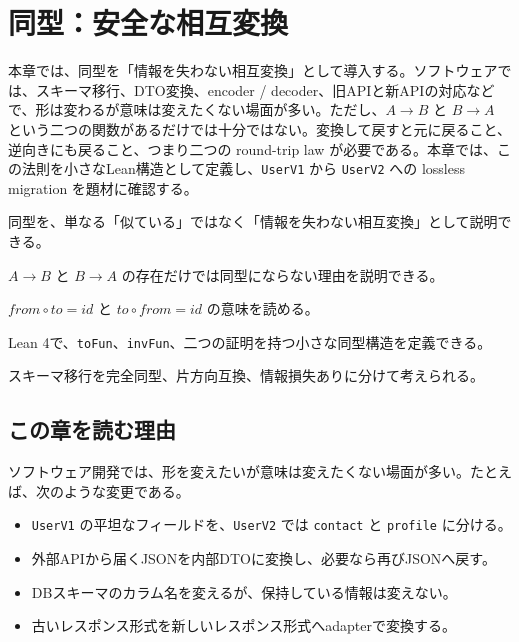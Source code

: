 \chapter{同型：安全な相互変換}
\label{chap:ch06-isomorphism}

\begin{chapterabstract}
本章では、同型を「情報を失わない相互変換」として導入する。ソフトウェアでは、スキーマ移行、DTO変換、encoder / decoder、旧APIと新APIの対応などで、形は変わるが意味は変えたくない場面が多い。ただし、$A \to B$ と $B \to A$ という二つの関数があるだけでは十分ではない。変換して戻すと元に戻ること、逆向きにも戻ること、つまり二つの round-trip law が必要である。本章では、この法則を小さなLean構造として定義し、\texttt{UserV1} から \texttt{UserV2} への lossless migration を題材に確認する。
\end{chapterabstract}

\begin{learninggoals}
\item 同型を、単なる「似ている」ではなく「情報を失わない相互変換」として説明できる。
\item $A \to B$ と $B \to A$ の存在だけでは同型にならない理由を説明できる。
\item $\mathit{from} \circ \mathit{to} = \mathit{id}$ と $\mathit{to} \circ \mathit{from} = \mathit{id}$ の意味を読める。
\item Lean 4で、\texttt{toFun}、\texttt{invFun}、二つの証明を持つ小さな同型構造を定義できる。
\item スキーマ移行を完全同型、片方向互換、情報損失ありに分けて考えられる。
\end{learninggoals}

\section{この章を読む理由}
\label{sec:ch06-why}

ソフトウェア開発では、形を変えたいが意味は変えたくない場面が多い。たとえば、次のような変更である。

\begin{itemize}
\item \texttt{UserV1} の平坦なフィールドを、\texttt{UserV2} では \texttt{contact} と \texttt{profile} に分ける。
\item 外部APIから届くJSONを内部DTOに変換し、必要なら再びJSONへ戻す。
\item DBスキーマのカラム名を変えるが、保持している情報は変えない。
\item 古いレスポンス形式を新しいレスポンス形式へadapterで変換する。
\end{itemize}

